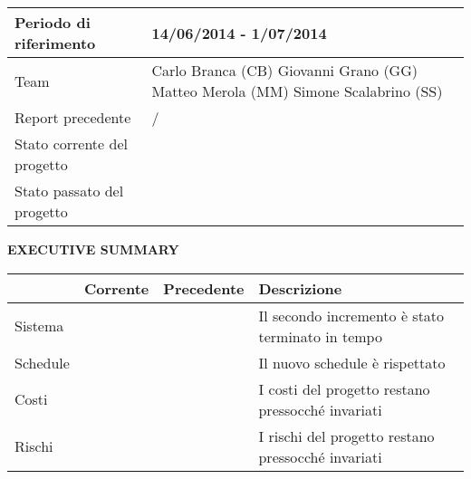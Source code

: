 
\begin{table}[ht]
\centering
\begin{tabular}{|g|p{8cm}|}
 \hline
  Periodo di riferimento		& 14/06/2014 - 1/07/2014\\
  \hline
  Team 					& Carlo Branca (CB)\newline
  					Giovanni Grano (GG)\newline
  					Matteo Merola (MM)\newline
  					Simone Scalabrino (SS)\\
  \hline
  Report precedente			& /\\
  \hline
  Stato corrente del progetto		& \\
  \hline
  Stato passato del progetto		& \\
  \hline
\end{tabular}
\end{table}

\begin{center} \textbf{EXECUTIVE SUMMARY} \end{center}
\begin{table}[ht]
\centering
\begin{tabular}{|h|p{2cm}|p{2cm}|p{5.5cm}|}
  \hline
  	& Corrente		& Precedente		& Descrizione\\
  \hline
  Sistema		& 	& 	& \footnotesize Il secondo incremento è stato terminato in tempo\\
  \hline
  Schedule		& 	& 	& \footnotesize Il nuovo schedule è rispettato\\
  \hline
  Costi			& 	& 	& \footnotesize I costi del progetto restano pressocché invariati\\
  \hline
  Rischi		& 	& 	& \footnotesize I rischi del progetto restano pressocché invariati\\
  \hline
\end{tabular}
\end{table}

